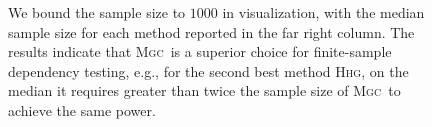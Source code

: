 \documentclass[simplex.tex]{subfiles}
\providecommand{\sct}[1]{{\normalfont\textsc{#1}}}
\newcommand{\Hhg}{\sct{Hhg}}
\newcommand{\Mgc}{\sct{Mgc}}
\begin{document}
\begin{figure}[h!]
\begin{cframed}
{%
We bound the sample size to $1000$ in visualization, with the median sample size for each method reported in the far right column. The results indicate that \Mgc~is a superior choice for finite-sample dependency testing, e.g., for the second best method \Hhg, on the median it requires greater than twice the sample size of \Mgc~to achieve the same power.}
		\label{fig:mgcall}
		\end{cframed}
\end{figure}

\clearpage
\end{document}
